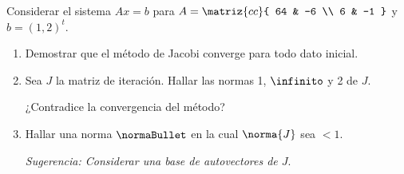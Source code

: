 \begin{enunciado}{\ejExtra}
  Considerar el sistema $Ax = b$ para
  $
    A = \matriz{cc}{
      64 & -6 \\
      6 & -1
    }
  $ y $b = (1,2)^t$.
  \begin{enumerate}[label=(\alph*)]
    \item Demostrar que el método de Jacobi converge para todo dato inicial.

    \item Sea $J$ la matriz de iteración. Hallar las normas 1, $\infinito$ y 2 de $J$.

          ¿Contradice la convergencia del método?

    \item Hallar una norma $\normaBullet$ en la cual $\norma{J}$ sea $<1$.

          \textit{Sugerencia: Considerar una base de autovectores de $J$}.
  \end{enumerate}
\end{enunciado}

